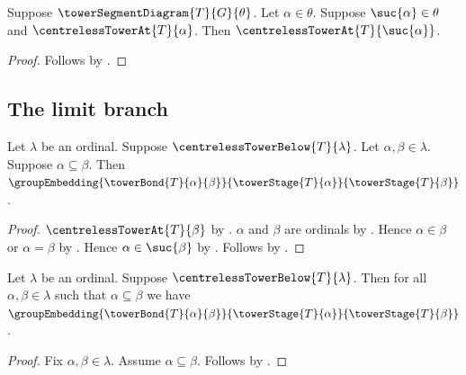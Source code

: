 \begin{proposition}\label{centreless_tower_at_successor}
    Suppose $\towerSegmentDiagram{T}{G}{\theta}$.
    Let $\alpha\in\theta$.
    Suppose $\suc{\alpha}\in\theta$ and
        $\centrelessTowerAt{T}{\alpha}$.
    Then $\centrelessTowerAt{T}{\suc{\alpha}}$.
\end{proposition}
\begin{proof}
    Follows by
        .
\end{proof}

\subsection{The limit branch}

\begin{proposition}\label{centreless_tower_below_bond_embedding}
    Let $\lambda$ be an ordinal.
    Suppose $\centrelessTowerBelow{T}{\lambda}$.
    Let $\alpha,\beta\in\lambda$.
    Suppose $\alpha\subseteq\beta$.
    Then $\groupEmbedding
        {\towerBond{T}{\alpha}{\beta}}
        {\towerStage{T}{\alpha}}
        {\towerStage{T}{\beta}}$.
\end{proposition}
\begin{proof}
    $\centrelessTowerAt{T}{\beta}$ by
        .
    $\alpha$ and $\beta$ are ordinals by
        .
    Hence $\alpha\in\beta$ or $\alpha=\beta$ by
        .
    Hence $\alpha\in\suc{\beta}$ by .
    Follows by .
\end{proof}

\begin{proposition}\label{centreless_tower_below_all_bonds_embedding}
    Let $\lambda$ be an ordinal.
    Suppose $\centrelessTowerBelow{T}{\lambda}$.
    Then for all $\alpha,\beta\in\lambda$ such that
        $\alpha\subseteq\beta$ we have
        $\groupEmbedding
            {\towerBond{T}{\alpha}{\beta}}
            {\towerStage{T}{\alpha}}
            {\towerStage{T}{\beta}}$.
\end{proposition}
\begin{proof}
    Fix $\alpha,\beta\in\lambda$.
    Assume $\alpha\subseteq\beta$.
    Follows by .
\end{proof}

